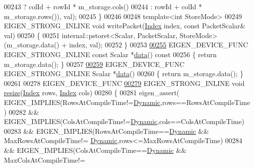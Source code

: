 \begin{DoxyCode}
00243                                    ? colId + rowId * m\_storage.cols()
00244                                    : rowId + colId * m\_storage.rows()), val);
00245     \}
00246 
00248     \textcolor{keyword}{template}<\textcolor{keywordtype}{int} StoreMode>
00249     EIGEN\_STRONG\_INLINE \textcolor{keywordtype}{void} writePacket(\hyperlink{namespace_eigen_a62e77e0933482dafde8fe197d9a2cfde}{Index} index, \textcolor{keyword}{const} PacketScalar& val)
00250     \{
00251       internal::pstoret<Scalar, PacketScalar, StoreMode>(m\_storage.data() + index, val);
00252     \}
00253 
\hyperlink{class_eigen_1_1_plain_object_base_ac25699535374b1854cf8494e44ad31b2}{00255}     EIGEN\_DEVICE\_FUNC EIGEN\_STRONG\_INLINE \textcolor{keyword}{const} Scalar *\hyperlink{class_eigen_1_1_plain_object_base_ac25699535374b1854cf8494e44ad31b2}{data}()\textcolor{keyword}{ const}
00256 \textcolor{keyword}{    }\{ \textcolor{keywordflow}{return} m\_storage.data(); \}
00257 
\hyperlink{class_eigen_1_1_plain_object_base_a54ed64f45b2f5e852355d5e2311810bd}{00259}     EIGEN\_DEVICE\_FUNC EIGEN\_STRONG\_INLINE Scalar *\hyperlink{class_eigen_1_1_plain_object_base_a54ed64f45b2f5e852355d5e2311810bd}{data}()
00260     \{ \textcolor{keywordflow}{return} m\_storage.data(); \}
00261 
00278     EIGEN\_DEVICE\_FUNC
\hyperlink{class_eigen_1_1_plain_object_base_a99d9054ee2d5a40c6e00ded0265e9cea}{00279}     EIGEN\_STRONG\_INLINE \textcolor{keywordtype}{void} \hyperlink{class_eigen_1_1_plain_object_base_a99d9054ee2d5a40c6e00ded0265e9cea}{resize}(\hyperlink{namespace_eigen_a62e77e0933482dafde8fe197d9a2cfde}{Index} rows, \hyperlink{namespace_eigen_a62e77e0933482dafde8fe197d9a2cfde}{Index} cols)
00280     \{
00281       eigen\_assert(   EIGEN\_IMPLIES(RowsAtCompileTime!=\hyperlink{namespace_eigen_ad81fa7195215a0ce30017dfac309f0b2}{Dynamic},rows==RowsAtCompileTime)
00282                    && EIGEN\_IMPLIES(ColsAtCompileTime!=\hyperlink{namespace_eigen_ad81fa7195215a0ce30017dfac309f0b2}{Dynamic},cols==ColsAtCompileTime)
00283                    && EIGEN\_IMPLIES(RowsAtCompileTime==\hyperlink{namespace_eigen_ad81fa7195215a0ce30017dfac309f0b2}{Dynamic} && MaxRowsAtCompileTime!=
      \hyperlink{namespace_eigen_ad81fa7195215a0ce30017dfac309f0b2}{Dynamic},rows<=MaxRowsAtCompileTime)
00284                    && EIGEN\_IMPLIES(ColsAtCompileTime==\hyperlink{namespace_eigen_ad81fa7195215a0ce30017dfac309f0b2}{Dynamic} && MaxColsAtCompileTime!=

\end{DoxyCode}
